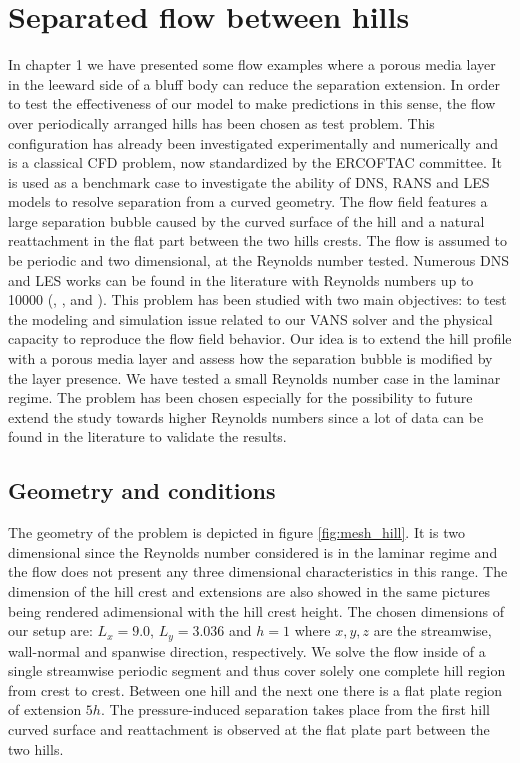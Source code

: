 \section{Separated flow between hills}
In chapter 1 we have presented some flow examples where a porous media layer in the leeward side of a bluff body can reduce the separation extension. In order to test the effectiveness of our model to make predictions in this sense, the flow over periodically arranged hills has been chosen as test problem. This configuration has already been investigated experimentally and numerically and is a classical CFD problem, now standardized by the ERCOFTAC committee.
It is used as a benchmark case to investigate the ability of DNS, RANS and LES models to resolve separation from a curved geometry.
The flow field features a large separation bubble caused by the curved surface of the hill and a natural reattachment in the flat part between the two hills crests. 
The flow is assumed to be periodic and two dimensional, at the Reynolds number tested. Numerous DNS and LES works can be found in the literature with Reynolds numbers up to 10000 (\citet{chang2014simulations}, \citet{breuer2005issues} \cite{breuer2009flow}, \citet{almeida1993wake} and \citet{temmerman2001large}).
This problem has been studied with two main objectives: to test the modeling and simulation issue related to our VANS solver and the physical capacity to reproduce the flow field behavior. 
Our idea is to extend the hill profile with a porous media layer and assess how the separation bubble is modified by the layer presence.
We have tested a small Reynolds number case in the laminar regime. The problem has been chosen especially for the possibility to future extend the study towards higher Reynolds numbers since a lot of data can be found in the literature to validate the results.

\subsection{Geometry and conditions}
The geometry of the problem is depicted in figure \ref{fig:mesh_hill}. It is two dimensional since the Reynolds number considered is in the laminar regime and the flow does not present any three dimensional characteristics in this range. The dimension of the hill crest and extensions are also showed in the same pictures being rendered adimensional with the hill crest height. The chosen dimensions of our setup are: $L_x = 9.0$, $L_y = 3.036$ and $h = 1$ where $x,y,z$ are the streamwise, wall-normal and spanwise direction, respectively. We solve the flow inside of a single streamwise periodic segment and thus cover solely one complete hill region from crest to crest.
Between one hill and the next one there is a flat plate region of extension $5h$. The pressure-induced separation takes place from the first hill curved surface and reattachment is observed at the flat plate part between the two hills.

